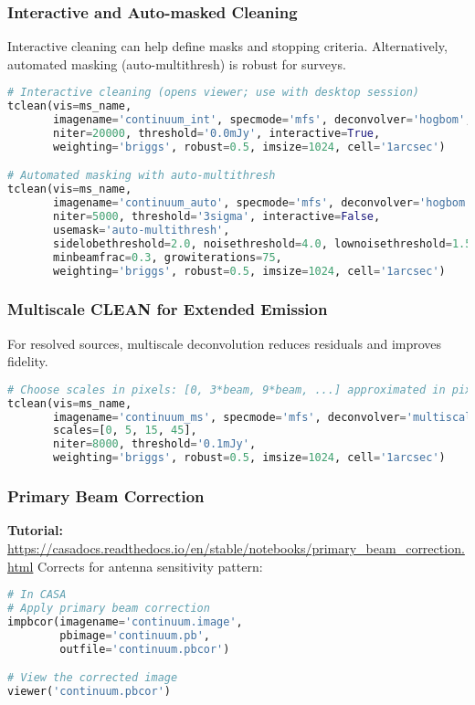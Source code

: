 \documentclass[11pt]{article}
\begin{document}
\subsubsection{Interactive and Auto-masked Cleaning}
Interactive cleaning can help define masks and stopping criteria. Alternatively, automated masking (auto-multithresh) is robust for surveys.
\begin{lstlisting}[language=Python]
# Interactive cleaning (opens viewer; use with desktop session)
tclean(vis=ms_name,
       imagename='continuum_int', specmode='mfs', deconvolver='hogbom',
       niter=20000, threshold='0.0mJy', interactive=True,
       weighting='briggs', robust=0.5, imsize=1024, cell='1arcsec')

# Automated masking with auto-multithresh
tclean(vis=ms_name,
       imagename='continuum_auto', specmode='mfs', deconvolver='hogbom',
       niter=5000, threshold='3sigma', interactive=False,
       usemask='auto-multithresh',
       sidelobethreshold=2.0, noisethreshold=4.0, lownoisethreshold=1.5,
       minbeamfrac=0.3, growiterations=75,
       weighting='briggs', robust=0.5, imsize=1024, cell='1arcsec')
\end{lstlisting}

\subsubsection{Multiscale CLEAN for Extended Emission}
For resolved sources, multiscale deconvolution reduces residuals and improves fidelity.
\begin{lstlisting}[language=Python]
# Choose scales in pixels: [0, 3*beam, 9*beam, ...] approximated in pixels
tclean(vis=ms_name,
       imagename='continuum_ms', specmode='mfs', deconvolver='multiscale',
       scales=[0, 5, 15, 45],
       niter=8000, threshold='0.1mJy',
       weighting='briggs', robust=0.5, imsize=1024, cell='1arcsec')
\end{lstlisting}

\subsubsection{Primary Beam Correction}
\textbf{Tutorial:} \url{https://casadocs.readthedocs.io/en/stable/notebooks/primary\_beam\_correction.html}
Corrects for antenna sensitivity pattern:

\begin{lstlisting}[language=Python]
# In CASA
# Apply primary beam correction
impbcor(imagename='continuum.image', 
        pbimage='continuum.pb', 
        outfile='continuum.pbcor')

# View the corrected image
viewer('continuum.pbcor')
\end{lstlisting}
\end{document}
